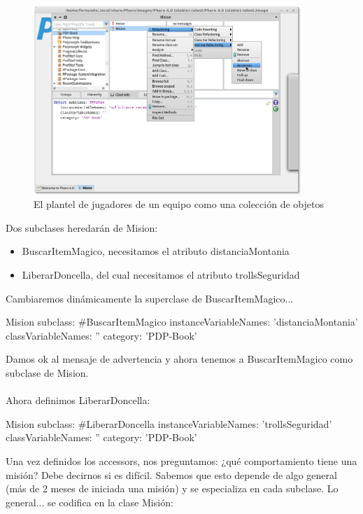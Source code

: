 \documentclass[a4paper,12pt]{book}
\begin{document}
\begin{figure}[h!]
    \centering
    \includegraphics[width=0.9\textwidth]{images/10_accessors.png}
    \caption{El plantel de jugadores de un equipo como una colección de objetos}
\end{figure}

Dos subclases heredarán de Mision: 

\begin{itemize}
 \item BuscarItemMagico, necesitamos el atributo distanciaMontania
 \item LiberarDoncella, del cual necesitamos el atributo trollsSeguridad
\end{itemize}

Cambiaremos dinámicamente la superclase de BuscarItemMagico...

\begin{code}
Mision subclass: #BuscarItemMagico
	instanceVariableNames: 'distanciaMontania'
	classVariableNames: ''
	category: 'PDP-Book'
\end{code}

Damos ok al mensaje de advertencia y ahora tenemos a BuscarItemMagico como subclase de Mision.
\\
\\
Ahora definimos LiberarDoncella:

\begin{code}
Mision subclass: #LiberarDoncella
	instanceVariableNames: 'trollsSeguridad'
	classVariableNames: ''
	category: 'PDP-Book'
\end{code}

Una vez definidos los accessors, nos preguntamos: ¿qué comportamiento tiene una misión? Debe decirnos
si es difícil. Sabemos que esto depende de algo general (más de 2 meses de iniciada una misión) y se
especializa en cada subclase. Lo general... se codifica en la clase Misión:
\end{document}
